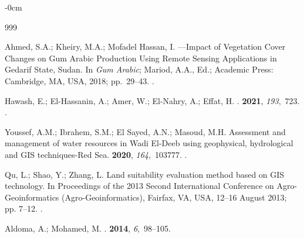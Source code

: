 \documentclass[jimaging,article,accept,pdftex,moreauthors]{Definitions/mdpi}
\begin{document}
\begin{adjustwidth}{-\extralength}{0cm}


\begin{thebibliography}{999}

Ahmed, S.A.; Kheiry, M.A.; {Mofadel Hassan}, I.
---Impact of Vegetation Cover Changes on Gum Arabic Production Using
  Remote Sensing Applications in Gedarif State, Sudan. In {\em Gum Arabic};
  Mariod, A.A., Ed.; Academic Press: Cambridge, MA, USA, %
 2018; \mbox{pp. 29--43}.
.

Hawash, E.; El-Hassanin, A.; Amer, W.; El-Nahry, A.; Effat, H.
.
 {\bf 2021}, {\em
  193},~723.
.

Youssef, A.M.; Ibrahem, S.M.; {El Sayed}, A.N.; Masoud, M.H.
\newblock Assessment and management of water resources in Wadi El-Deeb using
  geophysical, hydrological and GIS techniques-Red Sea.
 {\bf 2020}, {\em  164},~103777.
.

Qu, L.; Shao, Y.; Zhang, L.
\newblock Land suitability evaluation method based on GIS technology.
\newblock In Proceedings of the 2013 Second International Conference on
  Agro-Geoinformatics (Agro-Geoinformatics), Fairfax, VA, USA, 12--16 August 2013; pp. 7--12.
.

\clearpage
{}
Aldoma, A.; Mohamed, M.
.
 {\bf 2014}, {\em 6},~98--105.


\end{thebibliography}
\end{adjustwidth}
\end{document}
